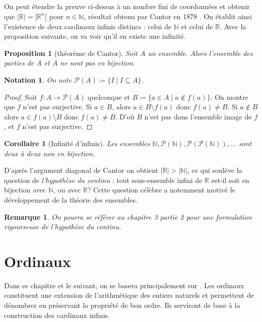 \documentclass[french]{article}
\theoremstyle{definition}
\theoremstyle{plain}
\newtheorem{proposition}[subsubsection]{Proposition}
\theoremstyle{plain}
\newtheorem{corollary}[subsubsection]{Corollaire}
\theoremstyle{plain}
\theoremstyle{plain}
\newtheorem{remark}[subsubsection]{Remarque}
\theoremstyle{plain}
\newtheorem*{notation}{Notation}
\begin{document}
\par On peut étendre la preuve ci-dessus à un nombre fini de coordonnées et obtenir que \( |\mathbb{R}| = |\mathbb{R}^{n}| \) pour \( n \in \mathbb{N} \), résultat obtenu par Cantor en 1878 \cite{kanamori2009set}. 
On établit ainsi l'existence de deux cardinaux infinis distincs : celui de \( \mathbb{N} \) et celui de \( \mathbb{R} \). Avec la proposition suivante, on va voir qu'il en existe une infinité.
\begin{proposition}[théorème de Cantor]
	Soit \( A \) un ensemble. Alors l'ensemble des parties de A et \( A \) ne sont pas en bijection.
\end{proposition} 
\begin{notation}
	On note \( \mathcal{P}(A) \coloneqq \{ I \mid I \subseteq A \}\).	
\end{notation}
\begin{proof}
	Soit \( f : A \rightarrow \mathcal{P}(A) \) quelconque et \( B \coloneqq \{ a \in A \mid a \not\in f(a)\} \). On montre que \( f \) n'est pas surjective. Si \( a \in B \), alors \( a \in B \setminus f(a) \) donc \( f(a) \neq B \). Si \( a \not\in B\) alors \( a \in f(a) \setminus B \) donc \( f(a) \neq B \). D'où \( B \) n'est pas dans l'ensemble image de \( f \), et \( f \) n'est pas surjective.
\end{proof}
\begin{corollary}[Infinité d'infinis]
	Les ensembles \( \mathbb{N}, \mathcal{P}(\mathbb{N}), \mathcal{P}(\mathcal{P}(\mathbb{N})), \ldots \) sont deux à deux non en bijection.
\end{corollary}

D'après l'argument diagonal de Cantor on obtient \( |\mathbb{R}| > |\mathbb{N}| \), ce qui soulève la question de \textit{l'hypothèse du continu} : tout sous-ensemble infini de \( \mathbb{R} \) est-il soit en bijection avec \( \mathbb{N} \), ou avec \( \mathbb{R} \)? Cette question célèbre a notemment motivé le développement de la théorie des ensembles.

\begin{remark}
	On pourra se référer au chapitre 3 partie 2 pour une formulation rigourseuse de l’hypothèse du continu. 
\end{remark}

\clearpage
\section{Ordinaux}

Dans ce chapitre et le suivant, on se basera principalement sur \cite{dehornoy2017théorie}. Les ordinaux constituent une extension de l'arithmétique des entiers naturels et permettent de dénombrer en préservant la propriété de bon ordre. Ils serviront de base à la construction des cardinaux infinis. 
\end{document}
